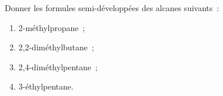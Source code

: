 Donner les formules semi-développées des alcanes suivants~:
\begin{enumerate}[label=\textbf{\alph*})]
    \item 2-méthylpropane~;
    \item 2,2-diméthylbutane~;
    \item 2,4-diméthylpentane~;
    \item 3-éthylpentane.
\end{enumerate}


